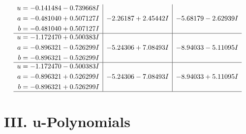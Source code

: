 \documentclass[1p]{elsarticle_modified}
\theoremstyle{definition}
\begin{document}
$$\begin{array}{c|c|c}
\begin{aligned}
u &= -0.141484 - 0.739668 I \\
a &= -0.481040 + 0.507127 I \\
b &= -0.481040 + 0.507127 I\end{aligned}
 & -2.26187 + 2.45442 I & -5.68179 - 2.62939 I \\ \hline\begin{aligned}
u &= -1.172470 + 0.500383 I \\
a &= -0.896321 - 0.526299 I \\
b &= -0.896321 - 0.526299 I\end{aligned}
 & -5.24306 + 7.08493 I & -8.94033 - 5.11095 I \\ \hline\begin{aligned}
u &= -1.172470 - 0.500383 I \\
a &= -0.896321 + 0.526299 I \\
b &= -0.896321 + 0.526299 I\end{aligned}
 & -5.24306 - 7.08493 I & -8.94033 + 5.11095 I\\
 \hline 
 \end{array}$$\newpage
\newpage\renewcommand{\arraystretch}{1}
\centering \section*{ III. u-Polynomials}
\end{document}
